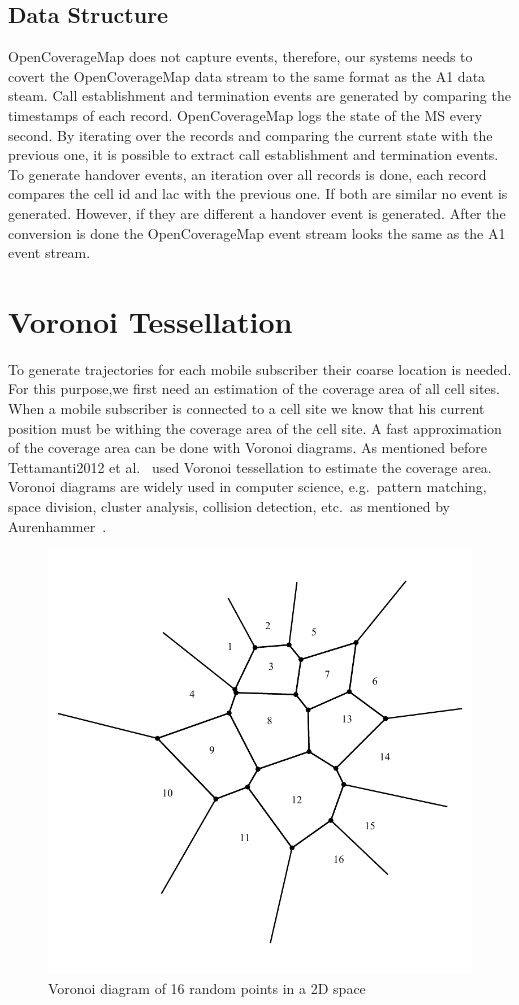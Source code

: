 \documentclass[master,english]{hgbthesis}
\begin{document}
\subsection{Data Structure}
OpenCoverageMap does not capture events, therefore, our systems needs to covert the OpenCoverageMap data stream to the same format as the A1 data steam. Call establishment and termination events are generated by comparing the timestamps of each record. OpenCoverageMap logs the state of the MS every second. By iterating over the records and comparing the current state with the previous one, it is possible to extract call establishment and termination events. To generate handover events, an iteration over all records is done, each record compares the cell id and lac with the previous one. If both are similar no event is generated. However, if they are different a handover event is generated. After the conversion is done the OpenCoverageMap event stream looks the same as the A1 event stream.
\section{Voronoi Tessellation}
\label{sec:voronoites}
To generate trajectories for each mobile subscriber their coarse location is needed.
For this purpose,we first need an estimation of the coverage area of all cell sites. When a mobile subscriber is connected to a cell site we know that his current position must be withing the coverage area of the cell site. A fast approximation of the coverage area can be done with Voronoi diagrams.
As mentioned before Tettamanti2012 et al.\ \cite{Tettamanti2012} used Voronoi tessellation to estimate the coverage area.
Voronoi diagrams are widely used in computer science, e.g.\ pattern matching, space division, cluster analysis, collision detection, etc.\ as mentioned by Aurenhammer~\cite{Aurenhammer1991}.
\begin{figure}
	\centering
	\includegraphics[width=0.7\linewidth]{./images/voronoi2}
	\caption{Voronoi diagram of 16 random points in a 2D space}
	\label{fig:voronoi2}
\end{figure}
\end{document}
